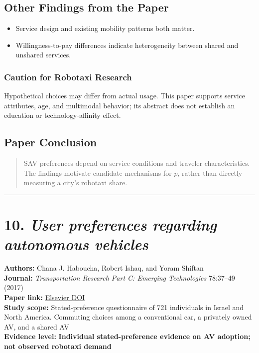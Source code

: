 \documentclass[10pt,a4paper]{article}
\providecommand{\tightlist}{\setlength{\itemsep}{0pt}\setlength{\parskip}{0pt}}
\begin{document}
\begin{mdframed}[linecolor=red!60,linewidth=2pt]
\begin{longtable}[]
\end{longtable}

\subsection{Other Findings from the Paper}

\begin{itemize}
\tightlist
\item
  Service design and existing mobility patterns both matter.
\item
  Willingness-to-pay differences indicate heterogeneity
  between shared and unshared services.
\end{itemize}

\subsubsection{Caution for Robotaxi Research}

Hypothetical choices may differ from actual usage.
This paper supports service attributes, age, and multimodal behavior;
its abstract does not establish an education or technology-affinity effect.

\subsection{Paper Conclusion}

\begin{quote}
SAV preferences depend on service conditions and traveler characteristics.
The findings motivate candidate mechanisms for $p$,
rather than directly measuring a city's robotaxi share.
\end{quote}


\begin{center}\rule{0.5\linewidth}{0.5pt}\end{center}

\hypertarget{user-preferences-regarding-autonomous-vehicles}{%
\section{\texorpdfstring{10. \emph{User preferences regarding autonomous vehicles}}{10. User preferences regarding autonomous vehicles}}\label{user-preferences-regarding-autonomous-vehicles}}

\textbf{Authors:} Chana J. Haboucha, Robert Ishaq, and Yoram Shiftan\\
\textbf{Journal:} \emph{Transportation Research Part C:
Emerging Technologies} 78:37--49 (2017)\\
\textbf{Paper link:}
\href{https://doi.org/10.1016/j.trc.2017.01.010}{Elsevier DOI}\\
\textbf{Study scope:} Stated-preference questionnaire of 721 individuals
in Israel and North America.
Commuting choices among a conventional car, a privately owned AV,
and a shared AV\\
\textbf{Evidence level:}
\textbf{Individual stated-preference evidence on AV adoption;
not observed robotaxi demand}


\end{mdframed}
\end{document}
